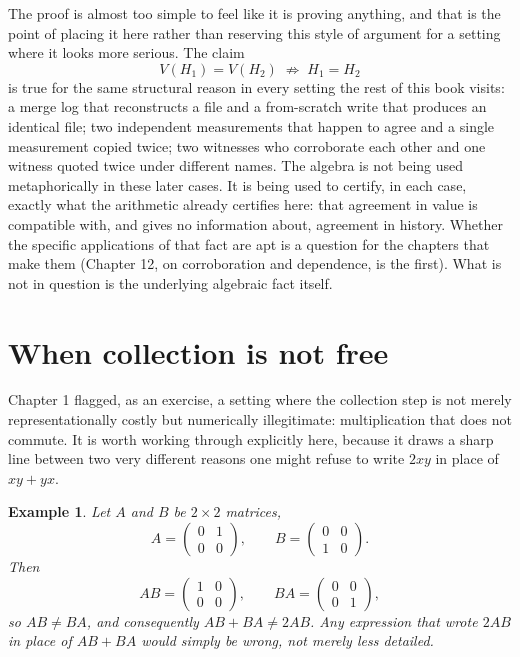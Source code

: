 \documentclass[11pt]{book}
\newtheorem{example}[theorem]{Example}
\begin{document}
The proof is almost too simple to feel like it is proving anything, and that is the point of placing it here rather than reserving this style of argument for a setting where it looks more serious. The claim
\[
V(H_1) = V(H_2) \;\not\Longrightarrow\; H_1 = H_2
\]
is true for the same structural reason in every setting the rest of this book visits: a merge log that reconstructs a file and a from-scratch write that produces an identical file; two independent measurements that happen to agree and a single measurement copied twice; two witnesses who corroborate each other and one witness quoted twice under different names. The algebra is not being used metaphorically in these later cases. It is being used to certify, in each case, exactly what the arithmetic already certifies here: that agreement in value is compatible with, and gives no information about, agreement in history. Whether the specific applications of that fact are apt is a question for the chapters that make them (Chapter 12, on corroboration and dependence, is the first). What is not in question is the underlying algebraic fact itself.

\section{When collection is not free}

Chapter 1 flagged, as an exercise, a setting where the collection step is not merely representationally costly but numerically illegitimate: multiplication that does not commute. It is worth working through explicitly here, because it draws a sharp line between two very different reasons one might refuse to write $2xy$ in place of $xy+yx$.

\begin{example}
Let $A$ and $B$ be $2\times 2$ matrices,
\[
A = \begin{pmatrix}0&1\\0&0\end{pmatrix}, \qquad B = \begin{pmatrix}0&0\\1&0\end{pmatrix}.
\]
Then
\[
AB = \begin{pmatrix}1&0\\0&0\end{pmatrix}, \qquad BA = \begin{pmatrix}0&0\\0&1\end{pmatrix},
\]
so $AB \ne BA$, and consequently $AB+BA \ne 2AB$. Any expression that wrote $2AB$ in place of $AB+BA$ would simply be wrong, not merely less detailed.
\end{example}
\end{document}
